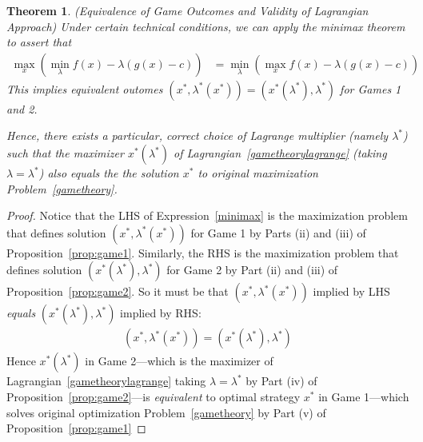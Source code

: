 \documentclass[12pt]{article}
\numberwithin{equation}{section} %
\theoremstyle{plain}
\newtheorem{thm}{Theorem}[section]
\theoremstyle{definition}
\theoremstyle{remark}
\newcommand{\ra}{\rightarrow}
\begin{document}
\begin{thm}
\emph{(Equivalence of Game Outcomes and Validity of Lagrangian Approach)}
Under certain technical conditions, we can apply the minimax theorem to
assert that
\begin{align}
  \max_x
  \left(
    \min_\lambda
    f(x) - \lambda(g(x)-c)
  \right)
  &=
  \min_\lambda
  \left(
    \max_x
    f(x) - \lambda(g(x)-c)
  \right)
  \label{minimax}
\end{align}
This implies equivalent outomes
$(x^*,\lambda^*(x^*))=(x^*(\lambda^*),\lambda^*)$ for Games 1 and 2.

Hence, there exists a particular, correct choice of Lagrange multiplier
(namely $\lambda^*$) such that the maximizer $x^*(\lambda^*)$ of
Lagrangian~\ref{gametheorylagrange} (taking $\lambda=\lambda^*$)
\emph{also} equals the the solution $x^*$ to original maximization
Problem~\ref{gametheory}.
\end{thm}
\begin{proof}
Notice that the LHS of Expression~\ref{minimax} is the maximization
problem that defines solution $(x^*,\lambda^*(x^*))$ for Game 1 by Parts
(ii) and (iii) of Proposition~\ref{prop:game1}.
Similarly, the RHS is the maximization problem that defines solution
$(x^*(\lambda^*),\lambda^*)$ for Game 2 by Part (ii) and (iii) of
Proposition~\ref{prop:game2}.
So it must be that $(x^*,\lambda^*(x^*))$ implied by LHS
\emph{equals} $(x^*(\lambda^*),\lambda^*)$ implied by RHS:
\begin{align*}
  (x^*,\lambda^*(x^*))
  = (x^*(\lambda^*),\lambda^*)
\end{align*}
Hence
$x^*(\lambda^*)$ in Game 2---which is the maximizer of
Lagrangian~\ref{gametheorylagrange} taking $\lambda=\lambda^*$ by Part
(iv) of Proposition~\ref{prop:game2}---is \emph{equivalent} to
optimal strategy $x^*$ in Game 1---which solves original optimization
Problem~\ref{gametheory} by Part (v) of Proposition~\ref{prop:game1}
\end{proof}




\end{document}
